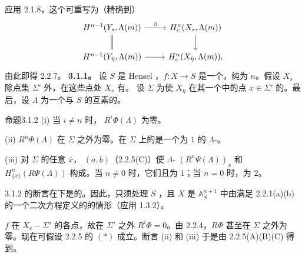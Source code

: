 应用 2.1.8，这个可重写为（精确到）
\[
\begin{tikzcd}
H^{n-1}(Y_s,\Lambda(m))\arrow[r,"\partial"]\arrow[d,equal]&H_c^n(X_s,\Lambda(m))\arrow[d]\\
H^{n-1}(Y_{\bar\eta},\Lambda(m))\arrow[r]&H_c^n(X_{\bar\eta},\Lambda(m)),
\end{tikzcd}
\]
由此即得 2.2.7。
\textbf{3.1.1。} 设 $S$ 是 Hensel ，$f:X\to S$ 是一个，纯为 $n$。假设 $X_s$ 除点集 $\Sigma'$ 外，在这些点处 $X_s$ 有。
设 $\Sigma$ 为使 $X_\eta$ 在其一个中的点 $x\in\Sigma'$ 的。最后，设 $\Lambda$ 为一个与 $S$ 的互素的。
\begin{SGAresult}{命题}{3.1.2}
(i) 当 $i\ne n$ 时， $R^i\Phi(\Lambda)$ 为零。

(ii)  $R^n\Phi(\Lambda)$ 在 $\Sigma$ 之外为零。在 $\Sigma$ 上的是一个为 $1$ 的 $\Lambda$-。

(iii) 对 $\Sigma$ 的任意 $\bar x$， $(a,b)$（2.2.5(C)）使 $\Lambda$- $(R^n\Psi(\Lambda))_{\bar x}$ 和 $H^n_{\{\bar x\}}(R\Psi(\Lambda))$ 构成。当 $n\ne0$ 时，它们且为 $1$；当 $n=0$ 时，为 $2$。
\end{SGAresult}
3.1.2 的断言在下是的。因此，只须处理 $S$ ，且 $X$ 是 $\mathbb A_S^{n+1}$ 中由满足 2.2.1(a)(b) 的一个二次方程定义的的情形（应用 1.3.2）。

$f$ 在 $X_s-\Sigma'$ 的各点，故在 $\Sigma'$ 之外 $R^i\Phi=0$。由 2.2.4，$R\Phi$ 甚至在 $\Sigma$ 之外为零。现在可假设 2.2.5 的 $(*)$ 成立。断言 (ii) 和 (iii) 于是由 2.2.5(A)(B)(C) 得到。

